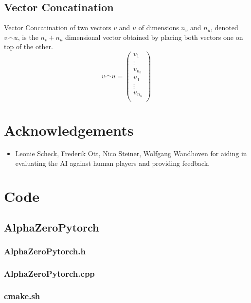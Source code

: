\documentclass[12pt]{article}
\newcommand{\incFile}[2]{\label{code:#2}\newpage}
\begin{document}
\subsection{Vector Concatination}\label{sec:ref:vectorConcatination}
Vector Concatination of two vectors \(v\) and \(u\) of dimensions \(n_v\) and  \(n_u\), denoted \(v\frown u\), is the \(n_v + n_u\) dimensional vector obtained by placing both vectors one on top of the other.
\begin{equation} \label{eq:ref:vecConcatination}
v\frown u = \left(
\begin{matrix}
v_1\\
\vdots\\
v_{n_v}\\
u_1\\
\vdots\\
u_{n_u}\\
\end{matrix}
\right)
\end{equation}




\section*{Acknowledgements}
\begin{itemize}
\item Leonie Scheck, Frederik Ott, Nico Steiner, Wolfgang Wandhoven for aiding in evaluating the AI against human players and providing feedback.
\end{itemize}

\newpage\section{Code}
\subsection{AlphaZeroPytorch}
\subsubsection{AlphaZeroPytorch.h}							\incFile{C++}{AlphaZeroPytorch/AlphaZeroPytorch.h}
\subsubsection{AlphaZeroPytorch.cpp}						\incFile{C++}{AlphaZeroPytorch/AlphaZeroPytorch.cpp}
\subsubsection{cmake.sh}												\incFile{sh}{AlphaZeroPytorch/cmake.sh}
\end{document}
